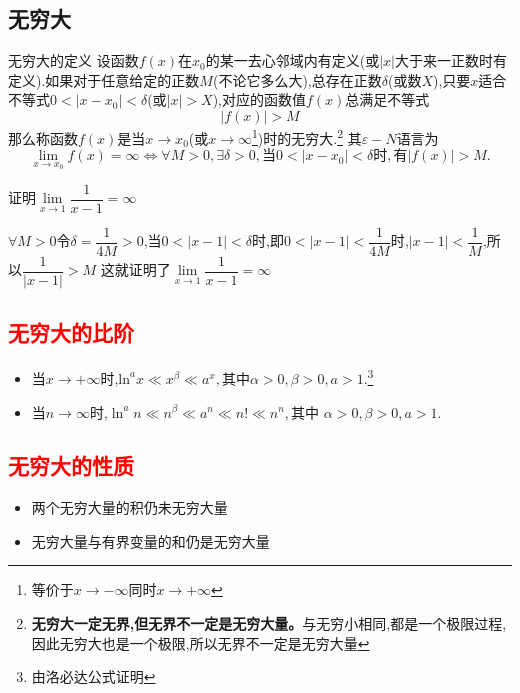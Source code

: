 \documentclass[10pt, a4paper, oneside, UTF8]{ctexbook}
\begin{document}
\begin{sloppypar}
    \subsection{无穷大}
    \begin{defn}{无穷大的定义}{}
        设函数$f(x)$在$x_0$的某一去心邻域内有定义(或$|x|$大于来一正数时有定义).如果对于任意给定的正数$M$(不论它多么大),总存在正数$\delta$(或数$X$),只要$x$适合不等式$0<|x-x_0|<\delta$(或$|x|>X$),对应的函数值$f(x)$总满足不等式
        $$
            |f(x)|>M
        $$
        那么称函数$f(x)$是当$x\to x_0$(或$x\to\infty$\footnote{等价于$x \to -\infty$同时$x \to +\infty$})时的无穷大.\footnote{\textbf{无穷大一定无界,但无界不一定是无穷大量。}与无穷小相同,都是一个极限过程,因此无穷大也是一个极限,所以无界不一定是无穷大量}
        其$\varepsilon-N$语言为
        $$
            \lim\limits_{x\to x_0}f(x)= \infty \Leftrightarrow\forall M >0,\exists\delta>0,\text{当}0<|x-x_0|<\delta\text{时},\text{有}|f(x)|>M.
        $$
    \end{defn}
    \begin{problem}
    证明$\underset{x\rightarrow1}{\operatorname*{lim}}\dfrac{1}{x-1}=\infty $
    \end{problem}
    \begin{solution}
        $\forall M>0$令$\delta=\dfrac{1}{4M}>0$,当$0<|x-1|<\delta$时,即$0<|x-1|<\dfrac{1}{4M}$时,$|x-1|<\dfrac{1}{M}$,所以$\dfrac{1}{|x-1|}>M$
        这就证明了$\underset{x\rightarrow1}{\operatorname*{lim}}\dfrac{1}{x-1}=\infty$
    \end{solution}
    \subsection{\textcolor{red}{无穷大的比阶}}
    \begin{itemize}
        \item 当$x \to +\infty$时,$\mathrm{ln}^ax\ll x^\beta\ll a^x,\text{其中}\alpha>0,\beta>0,a>1.$\footnote{由洛必达公式证明}
        \item 当$n \to \infty$时,$\ln^an\ll n^\beta\ll a^n\ll n!\ll n^n,\text{其中 }\alpha>0,\beta>0,a>1.$
    \end{itemize}
    \subsection{\textcolor{red}{无穷大的性质}}
    \begin{itemize}
        \item 两个无穷大量的积仍未无穷大量
        \item 无穷大量与有界变量的和仍是无穷大量
    \end{itemize}

\end{sloppypar}
\end{document}
